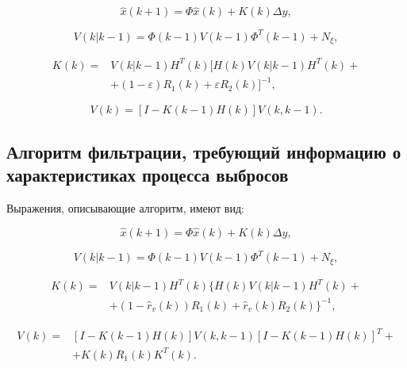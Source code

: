 \begin{equation}\label{eq3:optim3}
\hat{x}(k+1)=\Phi\hat{x}(k)+K(k)\Delta y,
\end{equation}

\begin{equation}\label{eq3:optim3_3}
V(k|k-1)=\Phi(k-1)V(k-1)\Phi^T(k-1)+N_\xi,
\end{equation}

\begin{equation}\label{eq3:optim3_4}
\begin{split}
K(k)=&V(k|k-1)H^T(k)[H(k)V(k|k-1)H^T(k)+\\
&+(1-\varepsilon)R_1(k)+\varepsilon R_2(k)]^{-1},
\end{split}
\end{equation}

\begin{equation}\label{eq3:optim3_5}
V(k)=[I-K(k-1)H(k)]V(k,k-1).
\end{equation}

\subsection{Алгоритм фильтрации, требующий информацию о характеристиках процесса выбросов} 
Выражения, описывающие алгоритм, имеют вид:

\begin{equation}\label{eq3:optim4}
\hat{x}(k+1)=\Phi\hat{x}(k)+K(k)\Delta y,
\end{equation}

\begin{equation}\label{eq3:optim4_3}
V(k|k-1)=\Phi(k-1)V(k-1)\Phi^T(k-1)+N_\xi,
\end{equation}

\begin{equation}\label{eq3:optim4_4}
\begin{split}
K(k)=&V(k|k-1)H^T(k)\{H(k)V(k|k-1)H^T(k)+\\
&+(1-\hat{r}_v(k))R_1(k)+\hat{r}_v(k)R_2(k)\}^{-1},
\end{split}
\end{equation}

\begin{equation}\label{eq3:optim4_5}
\begin{split}
V(k)=&[I-K(k-1)H(k)]V(k,k-1)[I-K(k-1)H(k)]^T+\\
&+K(k)R_1(k)K^T(k).
\end{split}
\end{equation}

